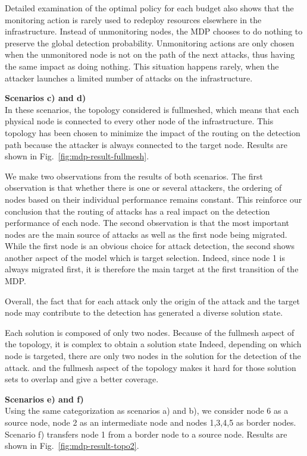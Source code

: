 Detailed examination of the optimal policy for each budget also shows that the monitoring action is rarely used to redeploy resources elsewhere in the infrastructure.
Instead of unmonitoring nodes, the MDP chooses to do nothing to preserve the global detection probability.
Unmonitoring actions are only chosen when the unmonitored node is not on the path of the next attacks, thus having the same impact as doing nothing. 
This situation happens rarely, when the attacker launches a limited number of attacks on the infrastructure.

\textbf{Scenarios c) and d) \\}
In these scenarios, the topology considered is fullmeshed, which means that each physical node is connected to every other node of the infrastructure. This topology has been chosen to minimize the impact of the routing on the detection path because the attacker is always connected to the target node.
Results are shown in Fig.~\ref{fig:mdp-result-fullmesh}.

We make two observations from the results of both scenarios.
The first observation is that whether there is one or several attackers, the ordering of nodes based on their individual performance remains constant. This reinforce our conclusion that the routing of attacks has a real impact on the detection performance of each node.
The second observation is that the most important nodes are the main source of attacks as well as the first node being migrated. While the first node is an obvious choice for attack detection, the second shows another aspect of the model which is target selection. Indeed, since node 1 is always migrated first, it is therefore the main target at the first transition of the MDP.

Overall, the fact that for each attack only the origin of the attack and the target node may contribute to the detection has generated a diverse solution state. 

Each solution is composed of only two nodes. Because of the fullmesh aspect of the topology, it is complex to obtain a solution state 
Indeed, depending on which node is targeted, there are only two nodes in the solution for the detection of the attack. and the fullmesh aspect of the topology makes it hard for those solution sets to overlap and give a better coverage.

\textbf{Scenarios e) and f) \\}
Using the same categorization as scenarios a) and b), we consider node 6 as a source node, node 2 as an intermediate node and nodes 1,3,4,5 as border nodes. Scenario f) transfers node 1 from a border node to a source node. Results are shown in Fig.~\ref{fig:mdp-result-topo2}.

